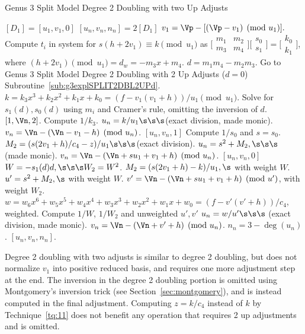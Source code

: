 \begin{algorithm}[htbp]
\caption{Genus 3 Split Model Degree 2 Doubling with two Up Adjusts\label{alg:g3explSPLIT2DBL2UP}}
\begin{algorithmic} [1]
\Require $[D_1]= [u_1, v_1,0]$ \smallskip
\Ensure $[u_n,v_n,n_n] = 2[D_1]$
\algrule
\State $v_1 = \Vp - [(\Vp - v_1) \pmod{u_1}].$
\State Compute $t_i$ in system for $s(h + 2v_1)\equiv k \pmod{u_1}$ as $ \bigl[
\begin{smallmatrix} m_1 & m_2\\ m_3 & m_4\end{smallmatrix}\bigr] \bigl[
\begin{smallmatrix} s_0\\ s_1 \end{smallmatrix} \bigr ] = \bigl[ \begin{smallmatrix}k_0
\\  k_1\end{smallmatrix} \bigr ]$, where $(h + 2v_1) \pmod{u_1} = d_w = -m_3x + m_4.$
\State $d = m_1m_4 - m_2m_3$.
    \State Go to Genus 3 Split Model Degree 2 Doubling with 2 Up Adjusts ($d=0$) Subroutine~\ref{sub:g3explSPLIT2DBL2UPd}.
\EndIf
\State $k = k_3x^3 + k_2x^2 + k_1x + k_0 = (f - v_1(v_1 + h))/u_1 \pmod{u_1}.$
\State Solve for $s_1(d), s_0(d)$ using $m_i$ and Cramer's rule, omitting the inversion of $d$.
         \Return $[1,\Vn,2]$.
        \Else \hspace{3pt}Compute $1/k_3$.
            \State $u_n = k/u_1 \s\s\s $(exact division, made monic).
            \State $v_n = \Vn - (\Vn - v_1 - h) \pmod{u_n}$.
            \State \Return $[u_n,v_n,1]$
        \EndIf
    \Else \hspace{3pt} Compute $1/s_0$ and $s= s_0$.
        \State $M_2 = (s(2v_1 + h)/c_4 - z)/u_1 \s\s\s $(exact division).
        \State $u_n = s^2 + M_2, \s\s\s $ (made monic).
        \State $v_n = \Vn - (\Vn + su_1 + v_1 + h) \pmod{u_n}$.
        \State \Return $[u_n,v_n,0]$
    \EndIf
\EndIf
\State $W = -s_1(d)d, \s\s\s W_2 = W^2$.
\State $M_2 = (s(2v_1 + h)- k)/u_1, \s$ with weight $W$.
\State $u' = s^2 + M_2, \s $ with weight $W$.
\State $v' = \Vn - (\Vn + su_1 + v_1 + h) \pmod{u'}$, with weight $W_2$.
\State $w = w_6x^6 + w_5x^5 + w_4x^4 + w_3x^3 + w_2x^2 +w_1x + w_0 = (f - v'(v' + h))/c_4$, weighted.
\State Compute $1/W$, $1/W_2$ and unweighted $u',v'$
\State $u_n = w/u' \s\s\s$ (exact division, made monic).
\State $v_n = \Vn - (\Vn + v' + h) \pmod{u_n}$.
\State $n_n = 3 - \deg(u_n)$.
\State \Return $[u_n, v_n,n_n]$.
\end{algorithmic}
\end{algorithm}
Degree 2 doubling with two adjusts is similar to degree 2 doubling, but does not
normalize $v_1$ into positive reduced basis, and requires one more adjustment
step at the end. The inversion in the degree 2 doubling portion is omitted using
Montgomery's inversion trick (see Section~\ref{sec:montgomery}), and is instead
computed in the final adjustment. Computing $z = k/c_4$ instead of $k$ by
Technique~\ref{tq:11} does not benefit any operation that requires 2 up
adjustments and is omitted. 

